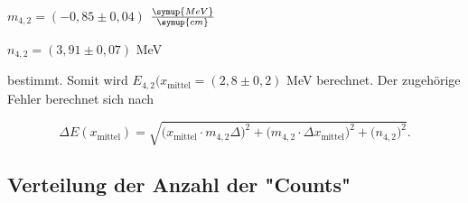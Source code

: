 \begin{center}
    $m_{4,2} = (-0,85 \pm 0,04)$ $\frac{\symup{MeV}}{\symup{cm}}$

    $n_{4,2} = (3,91 \pm 0,07)$ MeV
\end{center}

bestimmt.
Somit wird $E_{4,2}(x_\text{mittel} = (2,8 \pm 0,2)$ MeV berechnet. Der zugehörige Fehler berechnet sich nach

\begin{equation}
    \Delta E(x_\text{mittel}) = \sqrt{\bigg( x_\text{mittel} \cdot m_{4,2} \Delta \bigg)^2 + \bigg(m_{4,2} \cdot \Delta x_\text{mittel} \bigg)^2 + \bigg( n_{4,2} \bigg)^2}.
\end{equation}




\subsection{Verteilung der Anzahl der "Counts"}

